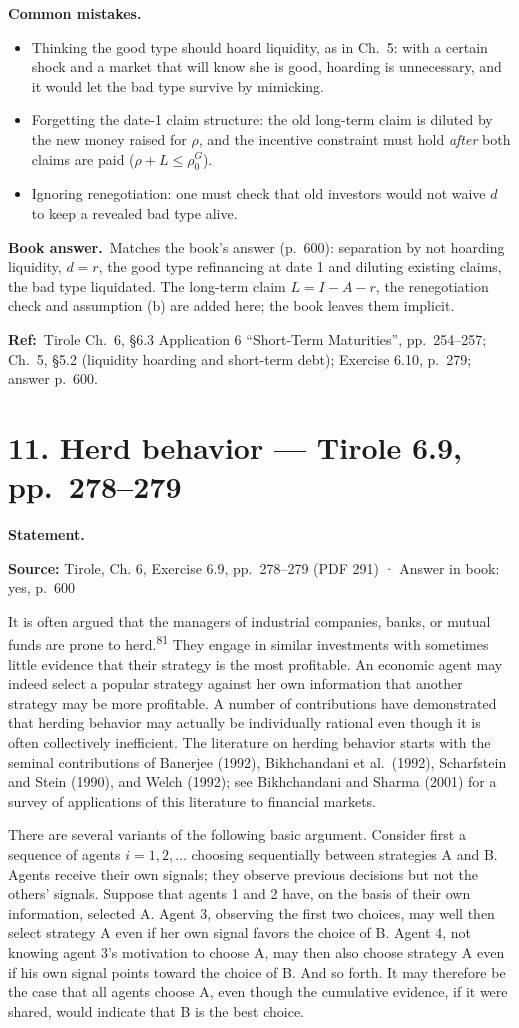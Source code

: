 \documentclass[11pt,a4paper]{article}
\newcommand{\exsec}[1]{\section*{\color{blue!55!black}#1}\addcontentsline{toc}{section}{#1}}
\newcommand{\bookans}{\par\medskip\noindent\textbf{Book answer.}~}
\newcommand{\refbib}{\par\smallskip\noindent\textbf{Ref:}~}
\newcommand{\pitfalls}{\par\medskip\noindent\textbf{Common mistakes.}}
\newcommand{\stmtbegin}{\par\medskip\noindent\textbf{Statement.}\par\nopagebreak\begingroup\small\setlength{\tabcolsep}{3pt}\sloppy}
\begin{document}
\pitfalls
\begin{itemize}
  \item Thinking the good type should hoard liquidity, as in Ch.~5: with a certain shock and a market that will know she is good, hoarding is unnecessary, and it would let the bad type survive by mimicking.
  \item Forgetting the date-1 claim structure: the old long-term claim is diluted by the new money raised for $\rho$, and the incentive constraint must hold \emph{after} both claims are paid ($\rho+L\le\rho_0^G$).
  \item Ignoring renegotiation: one must check that old investors would not waive $d$ to keep a revealed bad type alive.
\end{itemize}

\bookans Matches the book's answer (p.~600): separation by not hoarding liquidity, $d=r$, the good type
refinancing at date 1 and diluting existing claims, the bad type liquidated. The long-term claim
$L=I-A-r$, the renegotiation check and assumption (b) are added here; the book leaves them implicit.

\refbib{Tirole Ch.~6, \S6.3 Application 6 ``Short-Term Maturities'', pp.~254--257; Ch.~5, \S5.2
(liquidity hoarding and short-term debt); Exercise 6.10, p.~279; answer p.~600.}

\exsec{11. Herd behavior --- Tirole 6.9, pp.~278--279}
\stmtbegin
\textbf{Source:} Tirole, Ch. 6, Exercise 6.9, pp.~278--279 (PDF 291) · Answer in book: yes, p.~600

It is often argued that the managers of industrial companies, banks, or mutual funds are prone to
herd.\textsuperscript{81} They engage in similar investments with sometimes little evidence that
their strategy is the most profitable. An economic agent may indeed select a popular strategy
against her own information that another strategy may be more profitable. A number of contributions
have demonstrated that herding behavior may actually be individually rational even though it is
often collectively inefficient. The literature on herding behavior starts with the seminal
contributions of Banerjee (1992), Bikhchandani et al.~(1992), Scharfstein and Stein (1990), and
Welch (1992); see Bikhchandani and Sharma (2001) for a survey of applications of this literature to
financial markets.

There are several variants of the following basic argument. Consider first a sequence of agents
\(i = 1, 2, \dots\) choosing sequentially between strategies A and B. Agents receive their own
signals; they observe previous decisions but not the others' signals. Suppose that agents 1 and 2
have, on the basis of their own information, selected A. Agent 3, observing the first two choices,
may well then select strategy A even if her own signal favors the choice of B. Agent 4, not knowing
agent 3's motivation to choose A, may then also choose strategy A even if his own signal points
toward the choice of B. And so forth. It may therefore be the case that all agents choose A, even
though the cumulative evidence, if it were shared, would indicate that B is the best choice.
\end{document}
